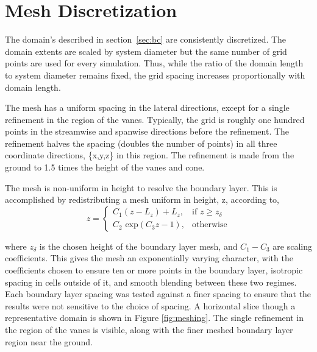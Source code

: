 %
%


\section{Mesh Discretization}

%
%
The domain's described in section~\ref{sec:bc} are
consistently discretized. The domain extents
are scaled by system diameter but the same number of grid points are used
for every simulation. Thus, while the ratio of the domain length to system
diameter remains fixed, the grid spacing increases proportionally with
domain length. 

The mesh has a uniform spacing in the lateral directions, except for a
single refinement in the region of the vanes. Typically, the grid is 
roughly one hundred points in the streamwise and spanwise directions
before the refinement. The refinement halves the spacing (doubles the
number of points) in all three
coordinate directions, \{x,y,z\} in this region. The refinement is made
from the ground to 1.5 times the height of the vanes and cone. 

The mesh is non-uniform in height to
resolve the boundary layer. This is accomplished by redistributing a
mesh uniform in height, z, according to,
\begin{equation}
 z = \begin{cases} C_1(z-L_z)+L_z,& \text{if } z \geq z_\delta\\
      C_2 \text{ exp}(C_3 z - 1),                 & \text{otherwise}
     \end{cases}
\end{equation}

where $z_\delta$ is the chosen height of the boundary layer mesh, and
$C_1-C_3$ are scaling coefficients. 
This gives the mesh an exponentially
varying character, with the coefficients chosen to ensure ten or more
points in the boundary layer, isotropic spacing in cells outside of
it, and smooth blending between these two regimes. Each boundary layer
spacing was tested against a finer spacing to ensure that the results
were not sensitive to the choice of spacing. A horizontal slice though a
representative domain is shown in Figure \ref{fig:meshing}. The single
refinement in the region of the vanes is visible, along with the finer
meshed boundary layer region near the ground. 

